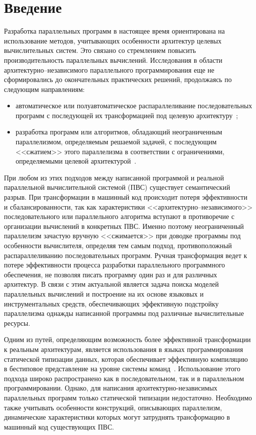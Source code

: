 \chapter*{Введение}
\label{intro}

Разработка параллельных программ в настоящее время ориентирована на использование методов, учитывающих особенности архитектур целевых вычислительных систем. Это связано со стремлением повысить производительность параллельных вычислений. Исследования в области архитектурно--независимого параллельного программирования еще не сформировались до окончательных практических решений, продолжаясь по следующим направлениям:
\begin{itemize}
	\item автоматическое или полуавтоматическое распараллеливание последовательных программ с последующей их трансформацией под целевую архитектуру~\cite{seq-par-01};
	\item разработка программ или алгоритмов, обладающий неограниченным параллелизмом, определяемым решаемой задачей, с последующим <<сжатием>> этого параллелизма в соответствии с ограничениями, определяемыми целевой архитектурой~\cite{aipp}.
\end{itemize}

При любом из этих подходов между написанной программой и реальной параллельной вычислительной системой (ПВС) существует семантический разрыв. При трансформации в машинный код происходит потеря эффективности и сбалансированности, так как характеристики <<архитектурно--независимого>> последовательного или параллельного алгоритма вступают в противоречие с организации вычислений в конкретных ПВС. Именно поэтому неограниченный параллелизм зачастую вручную <<сжимается>> при доводке программы под особенности вычислителя, определяя тем самым подход, противоположный распараллеливанию последовательных программ. Ручная трансформация ведет к потере эффективности процесса разработки параллельного программного обеспечения, не позволяя писать программу один раз и для различных архитектур. В связи с этим актуальной является задача поиска моделей параллельных вычислений и построение на их основе языковых и инструментальных средств, обеспечивающих эффективную подстройку параллелизма однажды написанной программы под различные вычислительные ресурсы.

Одним из путей, определяющим возможность более эффективной трансформации к реальным архитектурам, является использования в языках программирования статической типизации данных, которая обеспечивает эффективную компиляцию в бестиповое представление на уровне системы команд~\cite{types}. Использование этого подхода широко распространено как в последовательном, так и в параллельном программировании. Однако, для написания архитектурно-независимых параллельных программ только статической типизации недостаточно. Необходимо также учитывать особенности конструкций, описывающих параллелизм, динамические характеристики которых могут затруднять трансформацию в машинный код существующих ПВС. 


